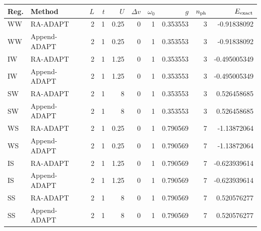 \documentclass[10pt,letterpaper]{article}
\begin{document}
\vspace{4pt}
\scriptsize
\setlength{\tabcolsep}{2.6pt}
\begin{longtable}{@{}llrrrrrrrr@{}}
\toprule
Reg. & Method & $L$ & $t$ & $U$ & $\Delta v$ & $\omega_0$ & $g$
& $n_{\rm ph}$ & $E_{\rm exact}$ \\
\midrule
WW & RA-ADAPT & 2 & 1 & 0.25 & 0 & 1 & 0.353553 & 3 & -0.91838092 \\
WW & Append-ADAPT & 2 & 1 & 0.25 & 0 & 1 & 0.353553 & 3 & -0.91838092 \\
IW & RA-ADAPT & 2 & 1 & 1.25 & 0 & 1 & 0.353553 & 3 & -0.495005349 \\
IW & Append-ADAPT & 2 & 1 & 1.25 & 0 & 1 & 0.353553 & 3 & -0.495005349 \\
SW & RA-ADAPT & 2 & 1 & 8 & 0 & 1 & 0.353553 & 3 & 0.526458685 \\
SW & Append-ADAPT & 2 & 1 & 8 & 0 & 1 & 0.353553 & 3 & 0.526458685 \\
WS & RA-ADAPT & 2 & 1 & 0.25 & 0 & 1 & 0.790569 & 7 & -1.13872064 \\
WS & Append-ADAPT & 2 & 1 & 0.25 & 0 & 1 & 0.790569 & 7 & -1.13872064 \\
IS & RA-ADAPT & 2 & 1 & 1.25 & 0 & 1 & 0.790569 & 7 & -0.623939614 \\
IS & Append-ADAPT & 2 & 1 & 1.25 & 0 & 1 & 0.790569 & 7 & -0.623939614 \\
SS & RA-ADAPT & 2 & 1 & 8 & 0 & 1 & 0.790569 & 7 & 0.520576277 \\
SS & Append-ADAPT & 2 & 1 & 8 & 0 & 1 & 0.790569 & 7 & 0.520576277 \\
\bottomrule
\end{longtable}
\end{document}
